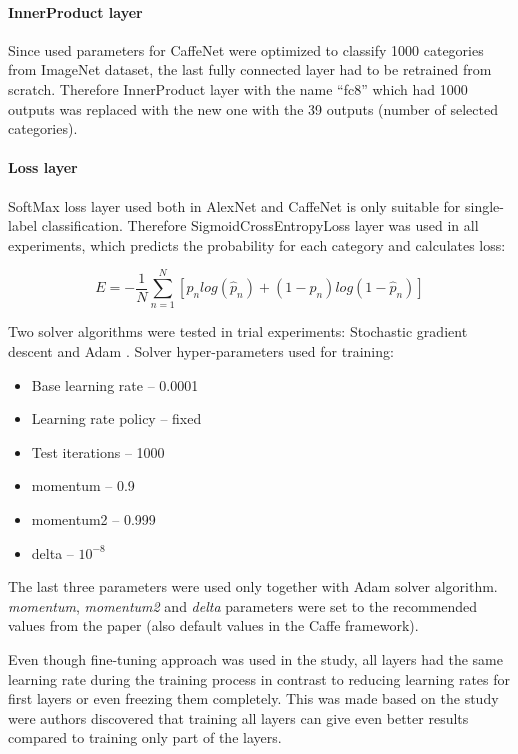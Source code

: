     \paragraph{InnerProduct layer}
    Since used parameters for CaffeNet were optimized to classify 1000 categories from ImageNet dataset, the last fully connected layer had to be retrained from scratch. Therefore InnerProduct layer with the name ``fc8'' which had 1000 outputs was replaced with the new one with the 39 outputs (number of selected categories).
    
    \paragraph{Loss layer}
    SoftMax loss layer used both in AlexNet and CaffeNet is only suitable for single-label classification. Therefore SigmoidCrossEntropyLoss layer was used in all experiments, which predicts the probability for each category and calculates loss:
    
    $$
    E = -\frac{1}{N} \sum_{n=1}^{N} [p_n log (\hat p_n) + (1 - p_n) log(1 - \hat p_n)]
    $$
    
    Two solver algorithms were tested in trial experiments: Stochastic gradient descent \cite{sgd} and Adam \cite{adam}. Solver hyper-parameters used for training:
    \begin{itemize}
        \item Base learning rate -- 0.0001
        \item Learning rate policy -- fixed
        \item Test iterations -- 1000
        \item momentum -- 0.9
        \item momentum2 -- 0.999
        \item delta -- $10^{-8}$
    \end{itemize}
    
    The last three parameters were used only together with Adam solver algorithm. \textit{momentum}, \textit{momentum2} and \textit{delta} parameters were set to the recommended values from the paper \cite{adam} (also default values in the Caffe framework).
    
    Even though fine-tuning approach was used in the study, all layers had the same learning rate during the training process in contrast to reducing learning rates for first layers or even freezing them completely. This was made based on the study \cite{Yosinski2014HowTransferable} were authors discovered that training all layers can give even better results compared to training only part of the layers.
    
